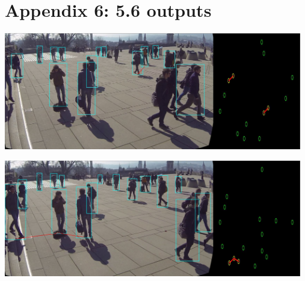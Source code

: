 \documentclass[12pt]{report}
\begin{document}
\section*{Appendix 6: 5.6 outputs}

\includegraphics[width=130mm]{./images/appendix/Unstable4.JPG}

\includegraphics[width=130mm]{./images/appendix/Unstable5.JPG}
\end{document}
